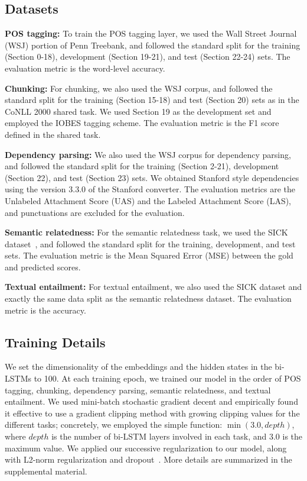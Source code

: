 \documentclass[11pt,a4paper]{article}
\begin{document}
\subsection{Datasets}
\label{subsec:datasets}

\noindent
{\bf POS tagging:}
To train the POS tagging layer, we used the Wall Street Journal (WSJ) portion of Penn Treebank, and followed the standard split for the training (Section 0-18), development (Section 19-21), and test (Section 22-24) sets.
The evaluation metric is the word-level accuracy.

\noindent
{\bf Chunking:}
For chunking, we also used the WSJ corpus, and followed the standard split for the training (Section 15-18) and test (Section 20) sets as in the CoNLL 2000 shared task.
We used Section 19 as the development set and employed the IOBES tagging scheme.
The evaluation metric is the F1 score defined in the shared task.

\noindent
{\bf Dependency parsing:}
We also used the WSJ corpus for dependency parsing, and followed the standard split for the training (Section 2-21), development (Section 22), and test (Section 23) sets.
We obtained Stanford style dependencies using the version 3.3.0 of the Stanford converter.
The evaluation metrics are the Unlabeled Attachment Score (UAS) and the Labeled Attachment Score (LAS), and punctuations are excluded for the evaluation.

\noindent
{\bf Semantic relatedness:}
For the semantic relatedness task, we used the SICK dataset~\citep{marelli2014}, and followed the standard split for the training, development, and test sets.
The evaluation metric is the Mean Squared Error (MSE) between the gold and predicted scores.

\noindent
{\bf Textual entailment:}
For textual entailment, we also used the SICK dataset and exactly the same data split as the semantic relatedness dataset.
The evaluation metric is the accuracy.

\subsection{Training Details}
\label{subsec:train_detail}
We set the dimensionality of the embeddings and the hidden states in the bi-LSTMs to 100.
At each training epoch, we trained our model in the order of POS tagging, chunking, dependency parsing, semantic relatedness, and textual entailment.
We used mini-batch stochastic gradient decent and empirically found it effective to use a gradient clipping method with growing clipping values for the different tasks; concretely, we employed the simple function: $\min(3.0, depth)$, where $depth$ is the number of bi-LSTM layers involved in each task, and $3.0$ is the maximum value.
We applied our successive regularization to our model, along with L2-norm regularization and dropout~\citep{dropout2014ver}.
More details are summarized in the supplemental material.
\end{document}
